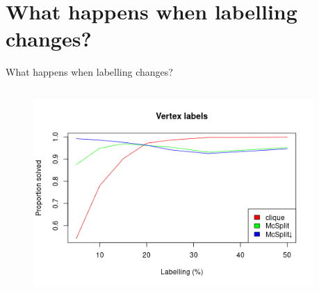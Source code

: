 \documentclass{beamer}
\begin{document}
\section{What happens when labelling changes?}
\begin{frame}{What happens when labelling changes?} %
  \begin{columns}
    \begin{column}{0.5\textwidth}
      \begin{figure}
        \centering
        \includegraphics[width=\textwidth]{../dissertation/images/vertex_labels_linechart.png}
      \end{figure}
    \end{column}
    \begin{column}{0.5\textwidth}

\end{column}
\end{columns}
\end{frame}
\end{document}
